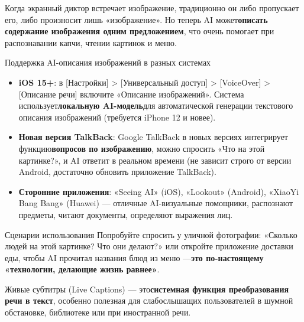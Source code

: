 
Когда экранный диктор встречает изображение, традиционно он либо пропускает его, либо произносит лишь «изображение». Но теперь AI может\textbf{описать содержание изображения одним предложением}, что очень помогает при распознавании капчи, чтении картинок и меню.

\begin{tcbinfo}{Поддержка AI-описания изображений в разных системах}
\begin{itemize}
  \item \textbf{iOS 15+}: в [Настройки] > [Универсальный доступ] > [VoiceOver] > [Описание речи] включите «Описание изображений». Система использует\textbf{локальную AI-модель}для автоматической генерации текстового описания изображений (требуется iPhone 12 и новее).
  \item \textbf{Новая версия TalkBack}: Google TalkBack в новых версиях интегрирует функцию\textbf{вопросов по изображению}, можно спросить «Что на этой картинке?», и AI ответит в реальном времени (не зависит строго от версии Android, достаточно обновить приложение TalkBack).
  \item \textbf{Сторонние приложения}: «Seeing AI» (iOS), «Lookout» (Android), «XiaoYi Bang Bang» (Huawei) — отличные AI-визуальные помощники, распознают предметы, читают документы, определяют выражения лиц.
\end{itemize}

\end{tcbinfo}

\begin{tcbpractice}{Сценарии использования}
Попробуйте спросить у уличной фотографии: «Сколько людей на этой картинке? Что они делают?» или откройте приложение доставки еды, чтобы AI прочитал названия блюд из меню —\textbf{это по-настоящему «технологии, делающие жизнь равнее»}.

\end{tcbpractice}


Живые субтитры (Live Captions) — это\textbf{системная функция преобразования речи в текст}, особенно полезная для слабослышащих пользователей в шумной обстановке, библиотеке или при иностранной речи.

